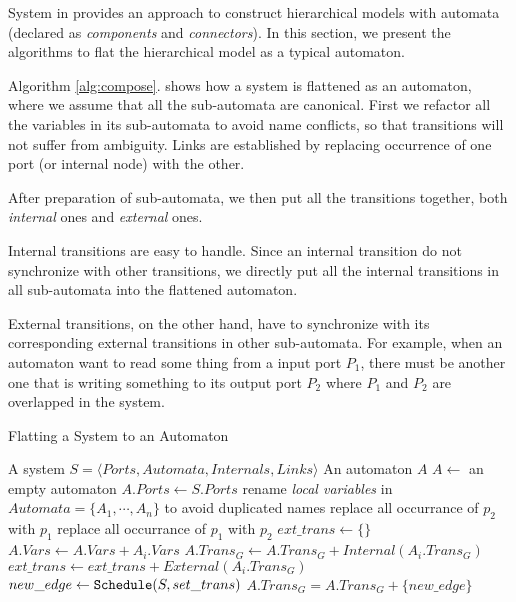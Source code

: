 System in \lang{} provides an approach to construct hierarchical models with automata (declared as \emph{components} and \emph{connectors}). In this section, we present the algorithms to flat the hierarchical model as a typical automaton.

Algorithm \ref{alg:compose}. shows how a system is flattened as an automaton, where we assume that all the sub-automata are canonical. First we refactor all the variables in its sub-automata to avoid name conflicts, so that transitions will not suffer from ambiguity.  Links are established by replacing occurrence of one port (or internal node) with the other.

After preparation of sub-automata, we then put all the transitions together, both \emph{internal} ones and \emph{external} ones.

Internal transitions are easy to handle. Since an internal transition do not synchronize with other transitions, we directly put all the internal transitions in all sub-automata into the flattened automaton.

External transitions, on the other hand, have to synchronize with its corresponding external transitions in other sub-automata. For example, when an automaton want to read some thing from a input port $P_1$, there must be another one that is writing something to its output port $P_2$ where $P_1$ and $P_2$ are overlapped in the system.

\begin{algorithm}[H]
    \caption{Flatting a System to an Automaton}
    \label{alg:compose}
    \begin{algorithmic}[1]
        \REQUIRE A system $S=\langle Ports, Automata, Internals, Links\rangle$
        \ENSURE An automaton $A$
        \STATE $A \leftarrow $ an empty automaton
        \STATE $A.Ports\leftarrow S.Ports$
        \STATE rename \emph{local variables} in $Automata=\{A_1,\cdots,A_n\}$ to avoid duplicated names
                \STATE replace all occurrance of $p_2$ with $p_1$
            \ELSE
                \STATE replace all occurrance of $p_1$ with $p_2$
            \ENDIF
        \ENDFOR
        \STATE $ext\_trans\leftarrow \{\}$
            \STATE $A.Vars\leftarrow A.Vars + A_i.Vars$
            \STATE $A.Trans_G \leftarrow A.Trans_G + Internal(A_i.Trans_G)$
            \STATE $ext\_trans \leftarrow ext\_trans + External(A_i.Trans_G)$
        \ENDFOR
            \STATE $new\_edge\leftarrow \mbox{\texttt{Schedule}}(S, set\_trans)$ 
                \STATE $A.Trans_G = A.Trans_G + \{new\_edge\}$
            \ENDIF
        \ENDFOR
    \end{algorithmic}
\end{algorithm}

